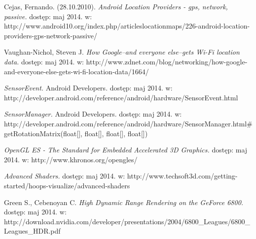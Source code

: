 \documentclass[a4paper,twocolumn,11pt]{article}
\begin{document}
\begin{thebibliography}{9}
 \small

  Cejas, Fernando.
                   (28.10.2010).
                   \emph{Android Location Providers - gps, network, passive.}
                   dostęp: maj 2014.
                   w: http://www.android10.org/index.php/articleslocationmaps/226-android-location-providers-gps-network-passive/
 
  Vaughan-Nichol, Steven J.
                    \emph{How Google--and everyone else--gets Wi-Fi location data.}
                    dostęp: maj 2014.
                    w: http://www.zdnet.com/blog/networking/how-google-and-everyone-else-gets-wi-fi-location-data/1664/

  \emph{SensorEvent.}
                              Android Developers.
                              dostęp: maj 2014.
                              w: http://developer.android.com/reference/android/hardware/SensorEvent.html

  \emph{SensorManager.}
                              Android Developers.
                              dostęp: maj 2014.
                              w: http://developer.android.com/reference/android/hardware/SensorManager.html\#getRotationMatrix(float[], float[], float[], float[])

  \emph{OpenGL ES - The Standard for Embedded Accelerated 3D Graphics.}
                  dostęp: maj 2014.
                  w: http://www.khronos.org/opengles/

  \emph{Advanced Shaders.}
                  dostęp: maj 2014.
                  w: http://www.techsoft3d.com/getting-started/hoops-visualize/advanced-shaders

  Green S., Cebenoyan C.
                   \emph{High Dynamic Range Rendering on the GeForce 6800.}
                   dostęp: maj 2014.
                   w: http://download.nvidia.com/developer/presentations/2004/6800\_Leagues/6800\_Leagues\_HDR.pdf

\end{thebibliography}
\end{document}

